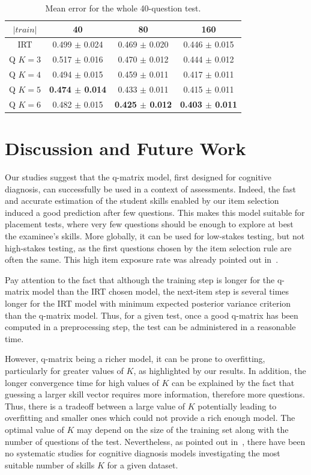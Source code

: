 \documentclass{sig-alternate}
\begin{document}
\begin{table}[H]
\small\centering\begin{tabular}{@{}cccc@{}}
$|train|$ & 40 & 80 & 160\\
\hline
IRT & 0.499 $\pm$ 0.024 & 0.469 $\pm$ 0.020 & 0.446 $\pm$ 0.015\\
Q $K = 3$ & 0.517 $\pm$ 0.016 & 0.470 $\pm$ 0.012 & 0.444 $\pm$ 0.012\\
Q $K = 4$ & 0.494 $\pm$ 0.015 & 0.459 $\pm$ 0.011 & 0.417 $\pm$ 0.011\\
Q $K = 5$ & \textbf{0.474 $\pm$ 0.014} & 0.433 $\pm$ 0.011 & 0.415 $\pm$ 0.011\\
Q $K = 6$ & 0.482 $\pm$ 0.015 & \textbf{0.425 $\pm$ 0.012} & \textbf{0.403 $\pm$ 0.011}\\
\end{tabular}
\caption{Mean error for the whole 40-question test.}
\label{tab:40q}
\end{table}

\section{Discussion and Future Work}

Our studies suggest that the q-matrix model, first designed for cognitive diagnosis, can successfully be used in a context of assessments. Indeed, the fast and accurate estimation of the student skills enabled by our item selection induced a good prediction after few questions. This makes this model suitable for placement tests, where very few questions should be enough to explore at best the examinee's skills. More globally, it can be used for low-stakes testing, but not high-stakes testing, as the first questions chosen by the item selection rule are often the same. This high item exposure rate was already pointed out in~\citep{Cheng2009}.

Pay attention to the fact that although the training step is longer for the q-matrix model than the IRT chosen model, the next-item step is several times longer for the IRT model with minimum expected posterior variance criterion than the q-matrix model. Thus, for a given test, once a good q-matrix has been computed in a preprocessing step, the test can be administered in a reasonable time. %

However, q-matrix being a richer model, it can be prone to overfitting, particularly for greater values of $K$, as highlighted by our results. In addition, the longer convergence time for high values of $K$ can be explained by the fact that guessing a larger skill vector requires more information, therefore more questions. Thus, there is a tradeoff between a large value of $K$ potentially leading to overfitting and smaller ones which could not provide a rich enough model. The optimal value of $K$ may depend on the size of the training set along with the number of questions of the test. Nevertheless, as pointed out in~\citep{Huebner2010}, there have been no systematic studies for cognitive diagnosis models investigating the most suitable number of skills $K$ for a given dataset.
\end{document}
